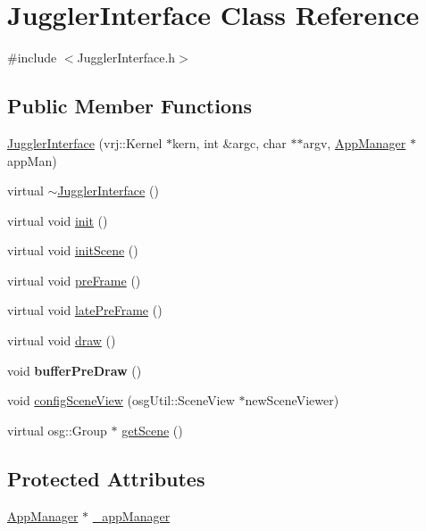 \hypertarget{class_juggler_interface}{
\section{JugglerInterface Class Reference}
\label{class_juggler_interface}
}


{\ttfamily \#include $<$JugglerInterface.h$>$}\subsection*{Public Member Functions}
\begin{DoxyCompactItemize}
\item 
\hyperlink{class_juggler_interface_a75fa9201e56035cb4b9f307c7c7ed6c1}{JugglerInterface} (vrj::Kernel $\ast$kern, int \&argc, char $\ast$$\ast$argv, \hyperlink{class_app_manager}{AppManager} $\ast$appMan)
\item 
virtual \hyperlink{class_juggler_interface_a1df97d920c8782507af2ac93d7e8c59a}{$\sim$JugglerInterface} ()
\item 
virtual void \hyperlink{class_juggler_interface_a3859e165d20b4a94fc5455b38916510a}{init} ()
\item 
virtual void \hyperlink{class_juggler_interface_a15216b15082909f6dc9cfbaf3b2fa367}{initScene} ()
\item 
virtual void \hyperlink{class_juggler_interface_a0df0aec708dc6e958212df9b13fdb561}{preFrame} ()
\item 
virtual void \hyperlink{class_juggler_interface_a5bb901dc4d7c08971c705ed6ce4b6591}{latePreFrame} ()
\item 
virtual void \hyperlink{class_juggler_interface_aa721246fac943544cb376a21c1d69edb}{draw} ()
\item 
\hypertarget{class_juggler_interface_aa45d1e43cb33157e941ff4d6cccfbb2c}{
void {\bfseries bufferPreDraw} ()}
\label{class_juggler_interface_aa45d1e43cb33157e941ff4d6cccfbb2c}

\item 
void \hyperlink{class_juggler_interface_ad139f98fc6a2d6b5f463ae90d8ce8597}{configSceneView} (osgUtil::SceneView $\ast$newSceneViewer)
\item 
virtual osg::Group $\ast$ \hyperlink{class_juggler_interface_ab17e6aa7dc1a248b1a74687a815cb8c3}{getScene} ()
\end{DoxyCompactItemize}
\subsection*{Protected Attributes}
\begin{DoxyCompactItemize}
\item 
\hyperlink{class_app_manager}{AppManager} $\ast$ \hyperlink{class_juggler_interface_a856ca6167dc926c37385d9bb58f44347}{\_\-appManager}
\end{DoxyCompactItemize}


